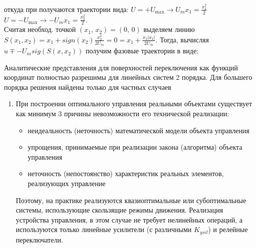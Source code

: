 \documentclass[preprint,russian,a5paper,10pt,twoside,mediummath]{ncc}
\begin{document}
откуда при получаются траектории вида: $U=+{{U}_{\max }}\to {{U}_{m}}{{x}_{1}}=\frac{x_{2}^{2}}{2}$ 
 $U=-{{U}_{\max }}\to -{{U}_{m}}{{x}_{1}}=\frac{x_{2}^{2}}{2}$.
\\Считая необход. точкой $\left( {{x}_{1}},\,{{x}_{2}} \right)=\left( 0,\,0 \right)$ выделяем линию $S\left( {{x}_{1}},{{x}_{2}} \right)={{x}_{1}}+sign\left( {{x}_{2}} \right)\frac{x_{2}^{2}}{2{{U}_{m}}}=0={{x}_{1}}+\frac{{{x}_{2}}\left| {{x}_{2}} \right|}{2{{U}_{m}}}$. Тогда, вычисляя $u\mp -{{U}_{m}}sig\left( S\left( x,{{x}_{2}} \right) \right)$ получим фазовые траектории в виде:
 \par Аналитические представления для поверхностей переключения как функций координат полностью разрешимы для линейных систем 2 порядка. Для большего порядка решения найдены только для частных случаев 
 \begin{enumerate}[resume]
 \item При построении оптимального управления реальными объектами существует как минимум 3 причины невозможности его технической реализации:
 \begin{itemize}
 \item неидеальность (неточность) математической модели объекта управления
 \item упрощения, принимаемые при реализации закона (алгоритма) объекта управления
 \item неточность (непостоянство) характеристик реальных элементов, реализующих управление
  \end{itemize}
  \par Поэтому, на практике реализуются квазиоптимальные или субоптимальные системы, использующие скользящие режимы движения. Реализация устройства управления, в этом случае не требует нелинейных операций, а используются только линейные усилители (с различными ${{K}_{ysil}}$) и релейные переключатели.
 \end{enumerate}
\end{document}
